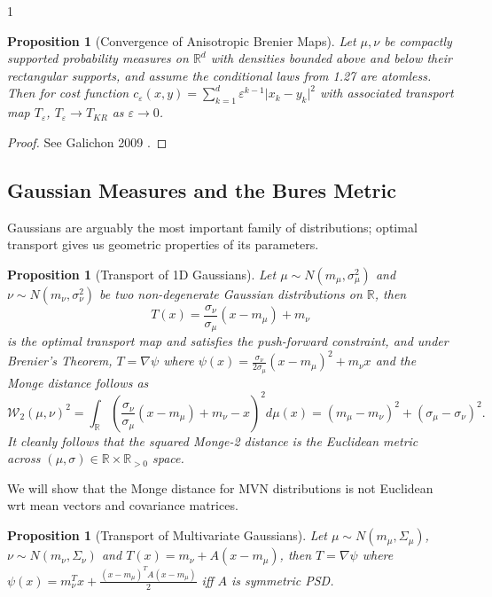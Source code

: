\documentclass[12pt]{article}
\newtheorem{proposition}[theorem]{Proposition}
\theoremstyle{definition}
\theoremstyle{plain}
\begin{document}
\begin{spacing}{1}
\begin{proposition}[Convergence of Anisotropic Brenier Maps]
    Let $\mu, \nu$ be compactly supported probability measures on $\mathbb{R}^d$ with densities bounded above and below their rectangular supports, and assume the conditional laws from 1.27 are atomless. Then for cost function $c_\varepsilon(x, y) = \sum_{k = 1}^d \varepsilon^{k - 1} \lvert x_k - y_k \rvert^2$ with associated transport map $T_\varepsilon$, $T_\varepsilon \rightarrow T_{KR}$ as $\varepsilon \rightarrow 0$.
\end{proposition}

\begin{proof}
    See Galichon 2009 \cite{galichon}.
\end{proof}

\subsection{Gaussian Measures and the Bures Metric}

Gaussians are arguably the most important family of distributions; optimal transport gives us geometric properties of its parameters.

\begin{proposition}[Transport of 1D Gaussians]
    Let $\mu \sim N(m_\mu, \sigma_\mu^2)$ and $\nu \sim N(m_\nu, \sigma_\nu^2)$ be two non-degenerate Gaussian distributions on $\mathbb{R}$, then
    \[
    T(x) = \frac{\sigma_\nu}{\sigma_\mu}(x - m_\mu) + m_\nu
    \]
    is the optimal transport map and satisfies the push-forward constraint, and under Brenier's Theorem, $T = \nabla \psi$ where $\psi(x) = \frac{\sigma_\nu}{2\sigma_\mu} (x - m_\mu)^2 + m_\nu x$ and the Monge distance follows as 
    \[
    \mathcal{W}_2(\mu, \nu)^2 = \displaystyle \int_\mathbb{R} (\frac{\sigma_\nu}{\sigma_\mu}(x - m_\mu) + m_\nu - x)^2 d\mu(x) = (m_\mu - m_\nu)^2 + (\sigma_\mu - \sigma_\nu)^2.
    \]
    It cleanly follows that the squared Monge-2 distance is the Euclidean metric across $(\mu, \sigma) \in \mathbb{R} \times \mathbb{R}_{>0}$ space.
\end{proposition}

We will show that the Monge distance for MVN distributions is not Euclidean wrt mean vectors and covariance matrices.

\begin{proposition}[Transport of Multivariate Gaussians]
    Let $\mu \sim N(m_\mu, \Sigma_\mu)$, $\nu \sim N(m_\nu, \Sigma_\nu)$ and $T(x) = m_\nu + A(x - m_\mu)$, then $T = \nabla \psi$ where $\psi(x) = m_\nu^T x + \frac{(x-m_\mu)^T A(x - m_\mu)}{2}$ iff $A$ is symmetric PSD.
\end{proposition}


\end{spacing}
\end{document}
